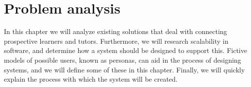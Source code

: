 \chapter{Problem analysis}
In this chapter we will analyze existing solutions that deal with connecting prospective learners and tutors.
Furthermore, we will research scalability in software, and determine how a system should be designed to support this.
Fictive models of possible users, known as personas, can aid in the process of designing systems, and we will define some of these in this chapter.
Finally, we will quickly explain the process with which the system will be created.




